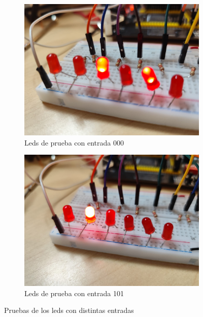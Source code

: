 \begin{figure}[H]
    \centering
    \begin{subfigure}{0.45\linewidth}
        \centering
        \includegraphics[width=\linewidth]{imagenes/000.png}
        \caption{Leds de prueba con entrada 000}
        \label{fig:000}
    \end{subfigure}
    \hfill
    \begin{subfigure}{0.45\linewidth}
        \centering
        \includegraphics[width=\linewidth]{imagenes/101.png}
        \caption{Leds de prueba con entrada 101}
        \label{fig:101}
    \end{subfigure}
    \caption{Pruebas de los leds con distintas entradas}
    \label{fig:leds}
\end{figure}


